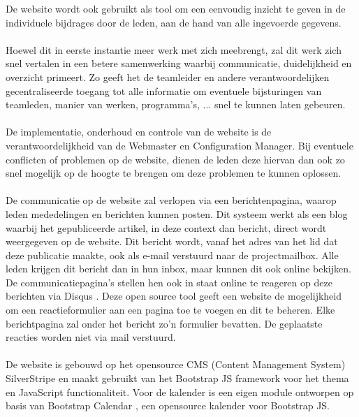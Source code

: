De website wordt ook gebruikt als tool om een eenvoudig inzicht te geven in de individuele bijdrages door de leden, aan de hand van alle ingevoerde gegevens. 
\\
\\
Hoewel dit in eerste instantie meer werk met zich meebrengt, zal dit werk zich snel vertalen in een betere samenwerking waarbij communicatie, duidelijkheid en overzicht primeert. Zo geeft het de teamleider en andere verantwoordelijken gecentraliseerde toegang tot alle informatie om eventuele bijsturingen van teamleden, manier van werken, programma’s, ... snel te kunnen laten gebeuren.
\\
\\
De implementatie, onderhoud en controle van de website is de verantwoordelijkheid van de Webmaster en Configuration Manager. Bij eventuele conflicten of problemen op de website, dienen de leden deze hiervan dan ook zo snel mogelijk op de hoogte te brengen om deze problemen te kunnen oplossen.
\\
\\
De communicatie op de website zal verlopen via een berichtenpagina, waarop leden mededelingen en berichten kunnen posten. Dit systeem werkt als een blog waarbij het gepubliceerde artikel, in deze context dan bericht, direct wordt weergegeven op de website. Dit bericht wordt, vanaf het adres van het lid dat deze publicatie maakte, ook als e-mail verstuurd naar de projectmailbox. Alle leden krijgen dit bericht dan in hun inbox, maar kunnen dit ook online bekijken. De communicatiepagina's stellen hen ook in staat online te reageren op deze berichten via Disqus \cite{Disqus}. Deze open source tool geeft een website de mogelijkheid om een reactieformulier aan een pagina toe te voegen en dit te beheren. Elke berichtpagina zal onder het bericht zo'n formulier bevatten. De geplaatste reacties worden niet via mail verstuurd.
\\
\\
De website is gebouwd op het opensource CMS (Content Management System) SilverStripe \cite{SilverStripe} en maakt gebruikt van het Bootstrap JS \cite{BootStrapJS} framework voor het thema en JavaScript functionaliteit. Voor de kalender is een eigen module ontworpen op basis van Bootstrap Calendar \cite{BootStrapCalender}, een opensource kalender voor Bootstrap JS.
\\
\\


